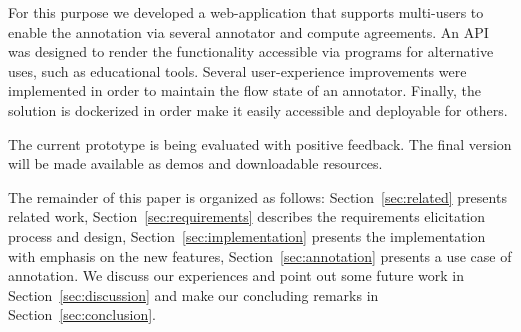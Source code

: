 For this purpose we developed a web-application that supports multi-users to enable the annotation via several annotator and compute agreements. 
An API was designed to render the functionality accessible via programs for alternative uses, such as educational tools. 
Several user-experience improvements were implemented in order to maintain the flow state of an annotator.
Finally, the solution is dockerized in order make it easily accessible and deployable for others. 

The current prototype is being evaluated with positive feedback. 
The final version will be made available as demos and downloadable resources. 

The remainder of this paper is organized as follows: 
Section~\ref{sec:related} presents related work, 
 Section~\ref{sec:requirements} describes the requirements elicitation process and design, 
 Section~\ref{sec:implementation} presents the implementation  with emphasis on the new features, 
Section~\ref{sec:annotation} presents a use case of annotation.
We discuss our experiences and point out some future work in Section~\ref{sec:discussion} and make our concluding remarks in
Section~\ref{sec:conclusion}.

